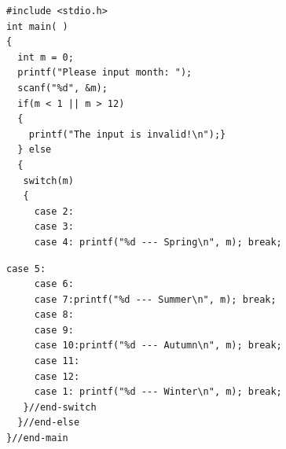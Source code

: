 \ifx\answer\undefined
\begin{frame}[fragile]
\begin{lstlisting}[xleftmargin=0.05\linewidth]
#include <stdio.h>
int main( )
{
  int m = 0;
  printf("Please input month: ");
  scanf("%d", &m);
  if(m < 1 || m > 12)
  {
    printf("The input is invalid!\n");}
  } else
  {
   switch(m)
   {
     case 2:
     case 3:
     case 4: printf("%d --- Spring\n", m); break;
\end{lstlisting}
\end{frame}
\fi

\ifx\answer\undefined
\begin{frame}[fragile]
	\begin{lstlisting}[xleftmargin=0.05\linewidth, firstnumber=15]
     case 5:
     case 6:
     case 7:printf("%d --- Summer\n", m); break;
     case 8:
     case 9:
     case 10:printf("%d --- Autumn\n", m); break;
     case 11:
     case 12:
     case 1: printf("%d --- Winter\n", m); break;
   }//end-switch
  }//end-else
}//end-main
	\end{lstlisting}
\end{frame}
\fi
